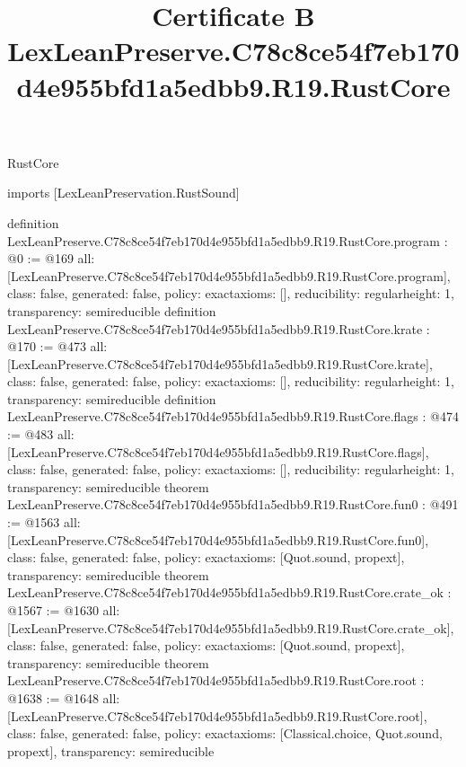 \begin{lexlean}{RustCore}
\title{Certificate B LexLeanPreserve.C78c8ce54f7eb170d4e955bfd1a5edbb9.R19.RustCore}
\begin{coremodule}
imports [LexLeanPreservation.RustSound]

definition LexLeanPreserve.C78c8ce54f7eb170d4e955bfd1a5edbb9.R19.RustCore.program : @0 := @169 {
  all: [LexLeanPreserve.C78c8ce54f7eb170d4e955bfd1a5edbb9.R19.RustCore.program],
  class: false,
  generated: false,
  policy: exact{axioms: []},
  reducibility: regular{height: 1},
  transparency: semireducible
}
definition LexLeanPreserve.C78c8ce54f7eb170d4e955bfd1a5edbb9.R19.RustCore.krate : @170 := @473 {
  all: [LexLeanPreserve.C78c8ce54f7eb170d4e955bfd1a5edbb9.R19.RustCore.krate],
  class: false,
  generated: false,
  policy: exact{axioms: []},
  reducibility: regular{height: 1},
  transparency: semireducible
}
definition LexLeanPreserve.C78c8ce54f7eb170d4e955bfd1a5edbb9.R19.RustCore.flags : @474 := @483 {
  all: [LexLeanPreserve.C78c8ce54f7eb170d4e955bfd1a5edbb9.R19.RustCore.flags],
  class: false,
  generated: false,
  policy: exact{axioms: []},
  reducibility: regular{height: 1},
  transparency: semireducible
}
theorem LexLeanPreserve.C78c8ce54f7eb170d4e955bfd1a5edbb9.R19.RustCore.fun0 : @491 := @1563 {
  all: [LexLeanPreserve.C78c8ce54f7eb170d4e955bfd1a5edbb9.R19.RustCore.fun0],
  class: false,
  generated: false,
  policy: exact{axioms: [Quot.sound, propext]},
  transparency: semireducible
}
theorem LexLeanPreserve.C78c8ce54f7eb170d4e955bfd1a5edbb9.R19.RustCore.crate_ok : @1567 := @1630 {
  all: [LexLeanPreserve.C78c8ce54f7eb170d4e955bfd1a5edbb9.R19.RustCore.crate_ok],
  class: false,
  generated: false,
  policy: exact{axioms: [Quot.sound, propext]},
  transparency: semireducible
}
theorem LexLeanPreserve.C78c8ce54f7eb170d4e955bfd1a5edbb9.R19.RustCore.root : @1638 := @1648 {
  all: [LexLeanPreserve.C78c8ce54f7eb170d4e955bfd1a5edbb9.R19.RustCore.root],
  class: false,
  generated: false,
  policy: exact{axioms: [Classical.choice, Quot.sound, propext]},
  transparency: semireducible
}


\end{coremodule}
\end{lexlean}
